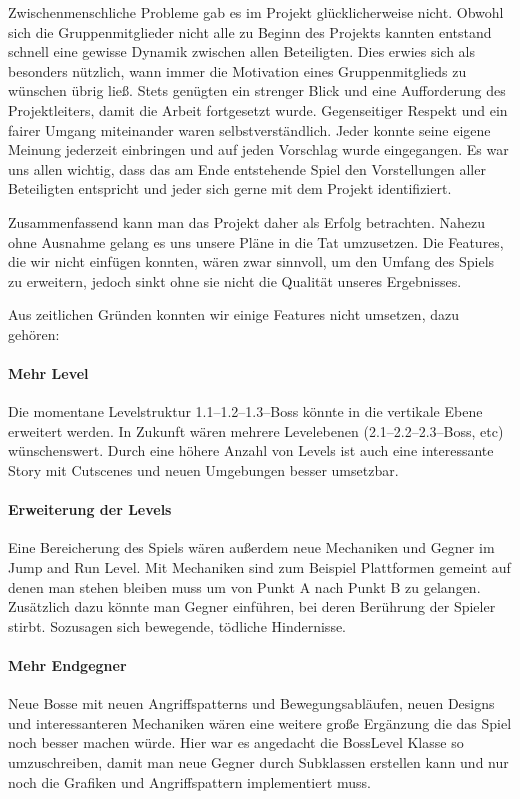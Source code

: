 Zwischenmenschliche Probleme gab es im Projekt glücklicherweise nicht. Obwohl sich die Gruppenmitglieder nicht alle zu Beginn des Projekts kannten entstand schnell eine gewisse Dynamik zwischen allen Beteiligten. Dies erwies sich als besonders nützlich, wann immer die Motivation eines Gruppenmitglieds zu wünschen übrig ließ. Stets genügten ein strenger Blick und eine Aufforderung des Projektleiters, damit die Arbeit fortgesetzt wurde.
 Gegenseitiger Respekt und ein fairer Umgang miteinander waren selbstverständlich. Jeder konnte seine eigene Meinung jederzeit einbringen und auf jeden Vorschlag wurde eingegangen. Es war uns allen wichtig, dass das am Ende entstehende Spiel den Vorstellungen aller Beteiligten entspricht und jeder sich gerne mit dem Projekt identifiziert.


Zusammenfassend kann man das Projekt daher als Erfolg betrachten. Nahezu ohne Ausnahme gelang es uns unsere Pläne in die Tat umzusetzen. Die Features, die wir nicht einfügen konnten, wären zwar sinnvoll, um den Umfang des Spiels zu erweitern, jedoch sinkt ohne sie nicht die Qualität unseres Ergebnisses.  

\label{sec:6_Features}

Aus zeitlichen Gründen konnten wir einige Features nicht umsetzen, dazu gehören:

\paragraph{Mehr Level}
Die momentane Levelstruktur 1.1--1.2--1.3--Boss könnte in die vertikale Ebene erweitert werden. In Zukunft wären mehrere Levelebenen (2.1--2.2--2.3--Boss, etc) wünschenswert. Durch eine höhere Anzahl von Levels ist auch eine interessante Story mit Cutscenes und neuen Umgebungen besser umsetzbar. 

\paragraph{Erweiterung der Levels}
Eine Bereicherung des Spiels wären außerdem neue Mechaniken und Gegner im Jump and Run Level. Mit Mechaniken sind zum Beispiel Plattformen gemeint auf denen man stehen bleiben muss um von Punkt A nach Punkt B zu gelangen. Zusätzlich dazu könnte man Gegner einführen, bei deren Berührung der Spieler stirbt. Sozusagen sich bewegende, tödliche Hindernisse.

\paragraph{Mehr Endgegner}
Neue Bosse mit neuen Angriffspatterns und Bewegungsabläufen, neuen Designs und interessanteren Mechaniken wären eine weitere große Ergänzung die das Spiel noch besser machen würde. Hier war es angedacht die BossLevel Klasse so umzuschreiben, damit man neue Gegner durch Subklassen erstellen kann und nur noch die Grafiken und Angriffspattern implementiert muss.

